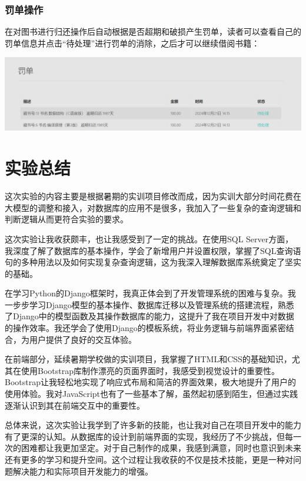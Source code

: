 \documentclass[a4paper,14pt]{article}
\begin{document}
\subsubsection{罚单操作}
在对图书进行归还操作后自动根据是否超期和破损产生罚单，读者可以查看自己的罚单信息并点击“待处理”进行罚单的消除，之后才可以继续借阅书籍：

\vspace{10pt}
\begin{center}
    \includegraphics[width=0.7\linewidth]{images/1罚单.png}\end{center}
\vspace{5pt}


 



\section{实验总结}
这次实验的内容主要是根据暑期的实训项目修改而成，因为实训大部分时间花费在大模型的调整和接入，对数据库的应用不是很多，我加入了一些复杂的查询逻辑和判断逻辑从而更符合实验的要求。

这次实验让我收获颇丰，也让我感受到了一定的挑战。在使用SQL Server方面，我深度了解了数据库的基本操作，学会了新增用户并设置权限，掌握了SQL查询语句的多种用法以及如何实现复杂查询逻辑，这为我深入理解数据库系统奠定了坚实的基础。

在学习Python的Django框架时，我真正体会到了开发管理系统的困难与复杂。我一步步学习Django模型的基本操作、数据库迁移以及管理系统的搭建流程，熟悉了Django中的模型函数及其操作数据库的能力，这提升了我在项目开发中对数据的操作效率。我还学会了使用Django的模板系统，将业务逻辑与前端界面紧密结合，为用户提供了良好的交互体验。

在前端部分，延续暑期学校做的实训项目，我掌握了HTML和CSS的基础知识，尤其在使用Bootstrap库制作漂亮的页面界面时，我感受到视觉设计的重要性。Bootstrap让我轻松地实现了响应式布局和简洁的界面效果，极大地提升了用户的使用体验。我对JavaScript也有了一些基本了解，虽然起初感到陌生，但通过实践逐渐认识到其在前端交互中的重要性。

总体来说，这次实验让我学到了许多新的技能，也让我对自己在项目开发中的能力有了更深的认知。从数据库的设计到前端界面的实现，我经历了不少挑战，但每一次的困难都让我更加坚定。对于自己制作的成果，我感到满意，同时也意识到未来还有更多的学习和提升空间。这个过程让我收获的不仅是技术技能，更是一种对问题解决能力和实际项目开发能力的增强。
\end{document}
